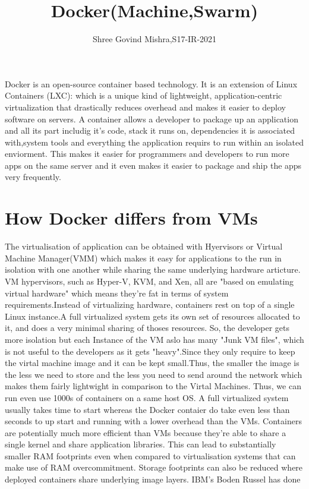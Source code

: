 \documentclass[9pt,twocolumn,twoside]{styles/osajnl}
\title{Docker(Machine,Swarm)}
\author[1]{Shree Govind Mishra,S17-IR-2021}
\affil[1]{School of Informatics and Computing, Bloomington, IN 47408, U.S.A.}
\affil[*]{Corresponding authors:shremish@indiana.edu}
\begin{document}
\maketitle

\cite{www-docker-2}Docker is an open-source container based technology. It is an extension
of Linux Containers (LXC): which is a unique kind of lightweight,
application-centric virtualization that drastically reduces overhead
and makes it easier to deploy software on servers. A container allows
a developer to package up an application and all its part includig
it's code, stack it runs on, dependencies it is associated with,system
tools and everything the application requirs to run within an
isolated enviorment. This makes it easier for programmers and
developers to run more apps on the same server and it even makes it
easier to package and ship the apps very frequently.

\section{ How Docker differs from VMs}

The virtualisation of application can be obtained with Hyervisors or
Virtual Machine Manager(VMM) which makes it easy for applications to
the run in isolation with one another while sharing the same
underlying hardware articture. VM hypervisors, such as Hyper-V, KVM,
and Xen, all are "based on emulating virtual hardware" which means
they’re fat in terms of system requirements.Instead of virtualizing
hardware, containers rest on top of a single Linux instance.A full
virtualized system gets its own set of resources allocated to it, and
does a very minimal sharing of thoses resources. So, the developer
gets more isolation but each Instance of the VM aslo has many "Junk VM
files", which is not useful to the developers as it gets "heavy".Since
they only require to keep the virtal machine image and it can be kept
small.Thus, the smaller the image is the less we need to store and the
less you need to send around the network which makes them fairly
lightwight in comparison to the Virtal Machines. Thus, we can run even
use 1000s of containers on a same host OS.
\cite{www-stackoverflow-docker}A full virtualized system usually
takes time to start whereas the Docker contaier do take even less than
seconds to up start and running with a lower overhead than the VMs.
Containers are potentially much more efficient than VMs because
they’re able to share a single kernel and share application libraries.
This can lead to substantially smaller RAM footprints even when
compared to virtualisation systems that can make use of RAM
overcommitment.  Storage footprints can also be reduced where deployed
containers share underlying image layers. IBM’s Boden Russel has done
\end{document}
